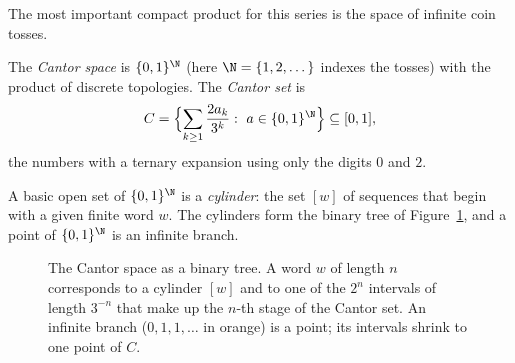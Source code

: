 The most important compact product for this series is the space of infinite coin tosses.

\begin{definition}
The \emph{Cantor space} is $\{0,1\}^\N$ (here $\N=\{1,2,\dots\}$ indexes the tosses) with the product of discrete topologies. The \emph{Cantor set} is
\[C=\Bigl\{\sum_{k\ge1}\frac{2a_k}{3^k}:\ a\in\{0,1\}^\N\Bigr\}\subseteq[0,1],\]
the numbers with a ternary expansion using only the digits $0$ and $2$.
\end{definition}

A basic open set of $\{0,1\}^\N$ is a \emph{cylinder}: the set $[w]$ of sequences that begin with a given finite word $w$. The cylinders form the binary tree of
Figure~\ref{fig:cantortree}, and a point of $\{0,1\}^\N$ is an infinite branch.

\begin{figure}[ht]
\centering
{}
\caption{The Cantor space as a binary tree. A word $w$ of length $n$ corresponds to a cylinder $[w]$ and to one of the $2^n$ intervals of length $3^{-n}$ that make up the
$n$-th stage of the Cantor set. An infinite branch ($0,1,1,\dots$ in orange) is a point; its intervals shrink to one point of $C$.}
\label{fig:cantortree}
\end{figure}

